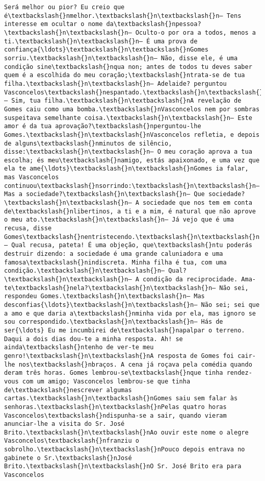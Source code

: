 \begin{Verbatim}[commandchars=\\\{\}]
Será melhor ou pior? Eu creio que é\textbackslash{}nmelhor.\textbackslash{}n\textbackslash{}n— Tens interesse em ocultar o nome da\textbackslash{}npessoa?\textbackslash{}n\textbackslash{}n— Oculto-o por ora a todos, menos a ti.\textbackslash{}n\textbackslash{}n— É uma prova de confiança{\ldots}\textbackslash{}n\textbackslash{}nGomes sorriu.\textbackslash{}n\textbackslash{}n— Não, disse ele, é uma condição sine\textbackslash{}nqua non; antes de todos tu deves saber quem é a escolhida do meu coração;\textbackslash{}ntrata-se de tua filha.\textbackslash{}n\textbackslash{}n— Adelaide? perguntou Vasconcelos\textbackslash{}nespantado.\textbackslash{}n\textbackslash{}n— Sim, tua filha.\textbackslash{}n\textbackslash{}nA revelação de Gomes caiu como uma bomba.\textbackslash{}nVasconcelos nem por sombras suspeitava semelhante coisa.\textbackslash{}n\textbackslash{}n— Este amor é da tua aprovação?\textbackslash{}nperguntou-lhe Gomes.\textbackslash{}n\textbackslash{}nVasconcelos refletia, e depois de alguns\textbackslash{}nminutos de silêncio, disse:\textbackslash{}n\textbackslash{}n— O meu coração aprova a tua escolha; és meu\textbackslash{}namigo, estás apaixonado, e uma vez que ela te ame{\ldots}\textbackslash{}n\textbackslash{}nGomes ia falar, mas Vasconcelos continuou\textbackslash{}nsorrindo:\textbackslash{}n\textbackslash{}n— Mas a sociedade?\textbackslash{}n\textbackslash{}n— Que sociedade?\textbackslash{}n\textbackslash{}n— A sociedade que nos tem em conta de\textbackslash{}nlibertinos, a ti e a mim, é natural que não aprove o meu ato.\textbackslash{}n\textbackslash{}n— Já vejo que é uma recusa, disse Gomes\textbackslash{}nentristecendo.\textbackslash{}n\textbackslash{}n— Qual recusa, pateta! É uma objeção, que\textbackslash{}ntu poderás destruir dizendo: a sociedade é uma grande caluniadora e uma famosa\textbackslash{}nindiscreta. Minha filha é tua, com uma condição.\textbackslash{}n\textbackslash{}n— Qual?\textbackslash{}n\textbackslash{}n— A condição da reciprocidade. Ama-te\textbackslash{}nela?\textbackslash{}n\textbackslash{}n— Não sei, respondeu Gomes.\textbackslash{}n\textbackslash{}n— Mas desconfias{\ldots}\textbackslash{}n\textbackslash{}n— Não sei; sei que a amo e que daria a\textbackslash{}nminha vida por ela, mas ignoro se sou correspondido.\textbackslash{}n\textbackslash{}n— Hás de ser{\ldots} Eu me incumbirei de\textbackslash{}napalpar o terreno. Daqui a dois dias dou-te a minha resposta. Ah! se ainda\textbackslash{}ntenho de ver-te meu genro!\textbackslash{}n\textbackslash{}nA resposta de Gomes foi cair-lhe nos\textbackslash{}nbraços. A cena já roçava pela comédia quando deram três horas. Gomes lembrou-se\textbackslash{}nque tinha rendez-vous com um amigo; Vasconcelos lembrou-se que tinha de\textbackslash{}nescrever algumas cartas.\textbackslash{}n\textbackslash{}nGomes saiu sem falar às senhoras.\textbackslash{}n\textbackslash{}nPelas quatro horas Vasconcelos\textbackslash{}ndispunha-se a sair, quando vieram anunciar-lhe a visita do Sr. José Brito.\textbackslash{}n\textbackslash{}nAo ouvir este nome o alegre Vasconcelos\textbackslash{}nfranziu o sobrolho.\textbackslash{}n\textbackslash{}nPouco depois entrava no gabinete o Sr.\textbackslash{}nJosé Brito.\textbackslash{}n\textbackslash{}nO Sr. José Brito era para Vasconcelos 
\end{Verbatim}
